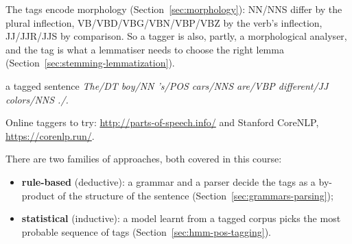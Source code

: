 \begin{nbintuition}
The tags encode morphology (Section~\ref{sec:morphology}): NN/NNS differ by the plural
inflection, VB/VBD/VBG/VBN/VBP/VBZ by the verb's inflection, JJ/JJR/JJS by comparison.
So a tagger is also, partly, a morphological analyser, and the tag is what a lemmatiser
needs to choose the right lemma (Section~\ref{sec:stemming-lemmatization}).
\end{nbintuition}

\begin{nbexample}{a tagged sentence}
\emph{The/DT boy/NN 's/POS cars/NNS are/VBP different/JJ colors/NNS ./.}
\end{nbexample}

Online taggers to try: \url{http://parts-of-speech.info/} and Stanford CoreNLP,
\url{https://corenlp.run/}.

There are two families of approaches, both covered in this course:
\begin{itemize}[nosep]
  \item \textbf{rule-based} (deductive): a grammar and a parser decide the tags as a
        by-product of the structure of the sentence (Section~\ref{sec:grammars-parsing});
  \item \textbf{statistical} (inductive): a model learnt from a tagged corpus picks the
        most probable sequence of tags (Section~\ref{sec:hmm-pos-tagging}).
\end{itemize}
